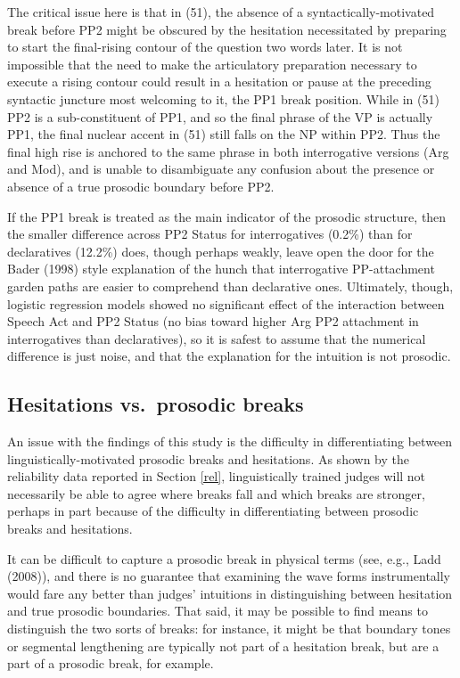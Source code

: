 \documentclass[11pt,oneside]{book}
\begin{document}
The critical issue here is that in (51), the absence of a syntactically-motivated break before PP2 might be obscured by the hesitation necessitated by preparing to start the final-rising contour of the question two words later. It is not impossible that the need to make the articulatory preparation necessary to execute a rising contour could result in a hesitation or pause at the preceding syntactic juncture most welcoming to it, the PP1 break position. While in (51) PP2 is a sub-constituent of PP1, and so the final phrase of the VP is actually PP1, the final nuclear accent in (51) still falls on the NP within PP2. Thus the final high rise is anchored to the same phrase in both interrogative versions (Arg and Mod), and is unable to disambiguate any confusion about the presence or absence of a true prosodic boundary before PP2.

If the PP1 break is treated as the main indicator of the prosodic structure, then the smaller difference across PP2 Status for interrogatives (0.2\%) than for declaratives (12.2\%) does, though perhaps weakly, leave open the door for the Bader (1998) style explanation of the hunch that interrogative PP-attachment garden paths are easier to comprehend than declarative ones. Ultimately, though, logistic regression models showed no significant effect of the interaction between Speech Act and PP2 Status (no bias toward higher Arg PP2 attachment in interrogatives than declaratives), so it is safest to assume that the numerical difference is just noise, and that the explanation for the intuition is not prosodic.

\hypertarget{hesi}{%
\subsection{Hesitations vs.~prosodic breaks}\label{hesi}}

An issue with the findings of this study is the difficulty in differentiating between linguistically-motivated prosodic breaks and hesitations. As shown by the reliability data reported in Section \ref{rel}, linguistically trained judges will not necessarily be able to agree where breaks fall and which breaks are stronger, perhaps in part because of the difficulty in differentiating between prosodic breaks and hesitations.

It can be difficult to capture a prosodic break in physical terms (see, e.g., Ladd (2008)), and there is no guarantee that examining the wave forms instrumentally would fare any better than judges' intuitions in distinguishing between hesitation and true prosodic boundaries. That said, it may be possible to find means to distinguish the two sorts of breaks: for instance, it might be that boundary tones or segmental lengthening are typically not part of a hesitation break, but are a part of a prosodic break, for example.
\end{document}
